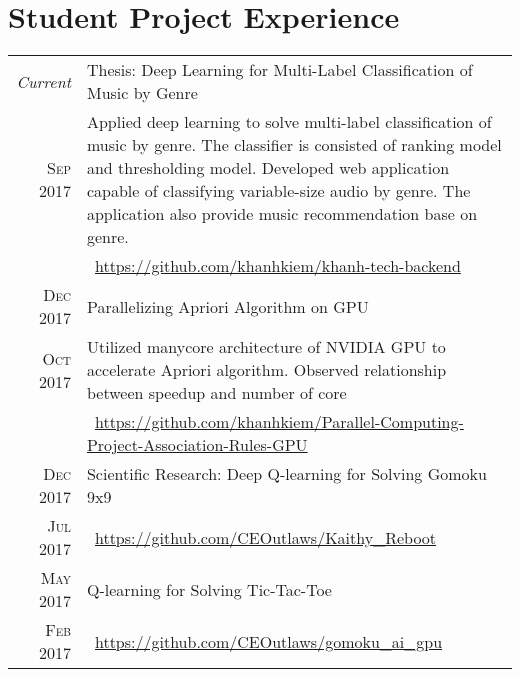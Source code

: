 \documentclass[a4paper,10pt]{article}
\begin{document}
\section{Student Project Experience}
\begin{tabular}{r|p{12cm}}
	\emph{Current} & Thesis: Deep Learning for Multi-Label Classification of Music by Genre\\ 
	\textsc{Sep 2017} & \footnotesize{Applied deep learning to solve multi-label classification of music by genre. The classifier is consisted of ranking model and thresholding model. Developed web application capable of classifying variable-size audio by genre. The application also provide music recommendation base on genre.} \\
	& \footnotesize{\faExternalLink\, \href{https://github.com/khanhkiem/khanh-tech-backend}{https://github.com/khanhkiem/khanh-tech-backend}}\\	
	\textsc{Dec 2017} & Parallelizing Apriori Algorithm on GPU\\
	\textsc{Oct 2017} & \footnotesize{Utilized manycore architecture of NVIDIA GPU to accelerate Apriori algorithm. Observed relationship between speedup and number of core}	\\
	& \footnotesize{\faExternalLink\, \href{https://github.com/khanhkiem/Parallel-Computing-Project-Association-Rules-GPU}{https://github.com/khanhkiem/Parallel-Computing-Project-Association-Rules-GPU}}\\
	\textsc{Dec 2017} & Scientific Research: Deep Q-learning for Solving Gomoku 9x9 \\
	\textsc{Jul 2017} & \footnotesize{\faExternalLink\, \href{https://github.com/CEOutlaws/Kaithy_Reboot}{https://github.com/CEOutlaws/Kaithy\_Reboot}}\\
	\textsc{May 2017} & Q-learning for Solving Tic-Tac-Toe \\
	\textsc{Feb 2017} & \footnotesize{\faExternalLink\, \href{https://github.com/CEOutlaws/gomoku_ai_gpu}{https://github.com/CEOutlaws/gomoku\_ai\_gpu}}\\	
\end{tabular}

\begin{tabular}{r|p{11cm}}
\end{tabular}
\end{document}
